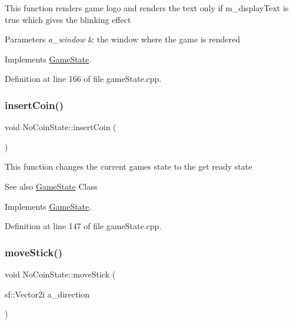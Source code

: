 This function renders game logo and renders the text only if m\+\_\+display\+Text is true which gives the blinking effect


\begin{DoxyParams}{Parameters}
{\em a\+\_\+window} & the window where the game is rendered \\
\hline
\end{DoxyParams}


Implements \hyperlink{class_game_state_a5ffd5ce9acb7499ddef613e8836d1ef8}{Game\+State}.



Definition at line 166 of file game\+State.\+cpp.

\mbox{\label{class_no_coin_state_a417209eadad2f71284cf09d369bc389e}} 
\subsubsection{\texorpdfstring{insert\+Coin()}{insertCoin()}}
{\footnotesize\ttfamily void No\+Coin\+State\+::insert\+Coin (\begin{DoxyParamCaption}{ }\end{DoxyParamCaption})\hspace{0.3cm}{\ttfamily [virtual]}}

This function changes the current game\textquotesingle{}s state to the get ready state \begin{DoxySeeAlso}{See also}
\hyperlink{class_game_state}{Game\+State} Class 
\end{DoxySeeAlso}


Implements \hyperlink{class_game_state_a4cd6f5b4ad23fc08dca287df26d94b94}{Game\+State}.



Definition at line 147 of file game\+State.\+cpp.

\mbox{\label{class_no_coin_state_a9fe8f36082705e6f5833244890093adc}} 
\subsubsection{\texorpdfstring{move\+Stick()}{moveStick()}}
{\footnotesize\ttfamily void No\+Coin\+State\+::move\+Stick (\begin{DoxyParamCaption}\item[{sf\+::\+Vector2i}]{a\+\_\+direction }\end{DoxyParamCaption})\hspace{0.3cm}{\ttfamily [virtual]}}

